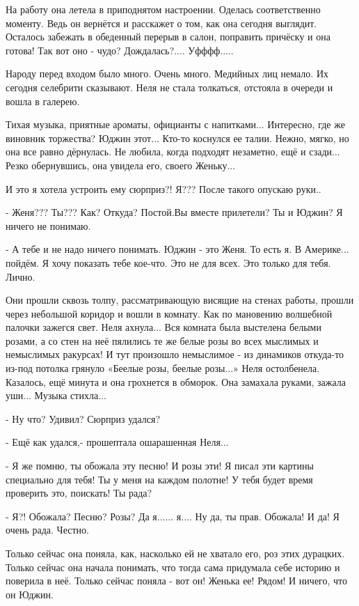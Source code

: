 На работу она летела в приподнятом настроении. Оделась соответственно
моменту. Ведь он вернётся и расскажет о том, как она сегодня выглядит. Осталось
забежать в обеденный перерыв в салон, поправить причёску и она готова! Так вот
оно - чудо? Дождалась?.... Уфффф.....

Народу перед входом было много. Очень много. Медийных лиц немало. Их сегодня
селебрити сказывают. Неля не стала толкаться, отстояла в очереди и вошла в
галерею.

Тихая музыка, приятные ароматы, официанты с напитками... Интересно, где же виновник
торжества? Юджин этот... Кто-то коснулся ее талии. Нежно, мягко, но она все равно
дёрнулась. Не любила, когда подходят незаметно, ещё и сзади... Резко
обернувшись, она увидела его, своего Женьку...

И это я хотела устроить ему сюрприз?! Я??? После такого опускаю руки..

- Женя??? Ты??? Как? Откуда? Постой.Вы вместе прилетели? Ты и Юджин? Я ничего не понимаю.

- А тебе и не надо ничего понимать. Юджин - это Женя. То есть я. В
Америке... пойдём. Я хочу показать тебе кое-что. Это не для всех. Это только для
тебя. Лично.

Они прошли сквозь толпу, рассматривающую висящие на стенах работы, прошли через
небольшой коридор и вошли в комнату. Как по мановению волшебной палочки зажегся
свет. Неля ахнула... Вся комната была выстелена белыми розами, а со стен на неё
пялились те же белые розы во всех мыслимых и немыслимых ракурсах! И тут
произошло немыслимое - из динамиков откуда-то из-под потолка грянуло «Беелые
розы, беелые розы...» Неля остолбенела. Казалось, ещё минута и она грохнется в
обморок. Она замахала руками, зажала уши... Музыка стихла...

- Ну что? Удивил? Сюрприз удался?

- Ещё как удался,- прошептала ошарашенная Неля...

- Я же помню, ты обожала эту песню! И розы эти! Я писал эти картины специально
для тебя! Ты у меня на каждом полотне! У тебя будет время проверить
это, поискать! Ты рада? 

- Я?! Обожала? Песню? Розы? Да я...... я.... Ну да, ты прав. Обожала! И да! Я
очень рада. Честно.

Только сейчас она поняла, как, насколько ей не хватало его, роз этих
дурацких. Только сейчас она начала понимать, что тогда сама придумала себе
историю и поверила в неё. Только сейчас поняла - вот он! Женька ее! Рядом! И
ничего, что он Юджин. 

